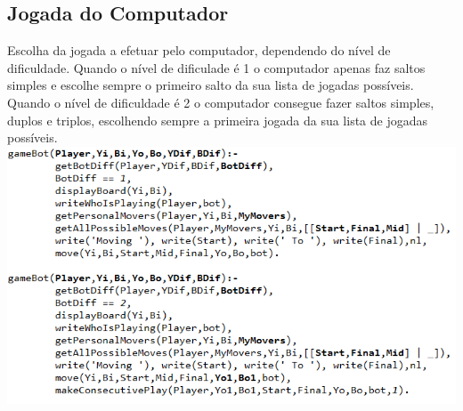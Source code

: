 \documentclass[a4paper]{article}
\begin{document}
\subsection{Jogada do Computador} Escolha da jogada a efetuar pelo computador, dependendo do nível de dificuldade.
Quando o nível de dificulade é 1 o computador apenas faz saltos simples e escolhe sempre o primeiro salto da sua lista de jogadas possíveis.\linebreak
Quando o nível de dificuldade é 2 o computador consegue fazer saltos simples, duplos e triplos, escolhendo sempre a primeira jogada da sua lista de jogadas possíveis.\linebreak
\includegraphics[scale=0.8]{gameBot.png}\linebreak\linebreak



\end{document}
